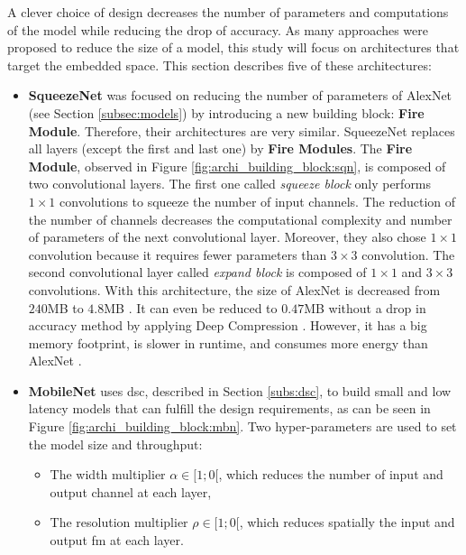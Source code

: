 A clever choice of design decreases the number of parameters and computations of the model while reducing the drop of accuracy. As many approaches were proposed to reduce the size of a model, this study will focus on architectures that target the embedded space. This section describes five of these architectures:
\begin{itemize}
    \item \textbf{SqueezeNet} \cite{iandola_squeezenet_2016} was focused on reducing the number of parameters of AlexNet (see Section \ref{subsec:models}) by introducing a new building block: \textbf{Fire Module}. Therefore, their architectures are very similar. SqueezeNet replaces all layers (except the first and last one) by \textbf{Fire Modules}. The \textbf{Fire Module}, observed in Figure \ref{fig:archi_building_block:sqn}, is composed of two convolutional layers. The first one called \textit{squeeze block} only performs $1 \times 1$ convolutions to squeeze the number of input channels. The reduction of the number of channels decreases the computational complexity and number of parameters of the next convolutional layer. Moreover, they also chose $1 \times 1$ convolution because it requires fewer parameters than $3 \times 3$ convolution.
    The second convolutional layer called \textit{expand block} is composed of $1 \times 1$ and $3 \times 3$ convolutions. With this architecture, the size of AlexNet is decreased from $240$MB to $4.8$MB \cite{iandola_squeezenet_2016}. It can even be reduced to $0.47$MB without a drop in accuracy method by applying Deep Compression \cite{han_deep_2016}. However, it has a big memory footprint, is slower in runtime, and consumes more energy than AlexNet \cite{sze_efficient_2017}.
    \item \textbf{MobileNet} \cite{howard_mobilenets_2017} uses \acrshort{dsc}, described in Section \ref{subs:dsc}, to build small and low latency models that can fulfill the design requirements, as can be seen in Figure \ref{fig:archi_building_block:mbn}. Two hyper-parameters are used to set the model size and throughput:
    \begin{itemize}
        \item The width multiplier $\alpha \in [1; 0[$, which reduces the number of input and output channel at each layer,
        \item The resolution multiplier $\rho \in [1; 0[$,  which reduces spatially the input and output \acrshort{fm} at each layer.
    \end{itemize}

\end{itemize}
